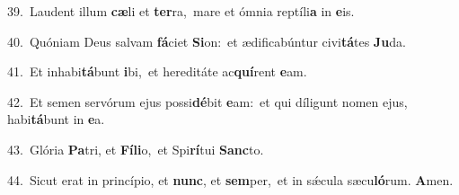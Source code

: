 {\numbfont\textcolor{\numbcolor}{39.}}~Laudent illum \textbf{cæ}\-li et \textbf{ter}\-ra,~\star mare et ómnia reptíli\textbf{a} in \textbf{e}\-is.\par
{\numbfont\textcolor{\numbcolor}{40.}}~Quóniam Deus salvam \textbf{fá}\-ciet \textbf{Si}\-on:~\star et ædificabúntur civi\-\textbf{tá}\-tes \textbf{Ju}\-da.\par
{\numbfont\textcolor{\numbcolor}{41.}}~Et inhabi\-\textbf{tá}\-bunt \textbf{i}\-bi,~\star et hereditáte ac\-\textbf{quí}\-rent \textbf{e}\-am.\par
{\numbfont\textcolor{\numbcolor}{42.}}~Et semen servórum ejus possi\-\textbf{dé}\-bit \textbf{e}\-am:~\star et qui díligunt nomen ejus, habi\-\textbf{tá}\-bunt in \textbf{e}\-a.\par
{\numbfont\textcolor{\numbcolor}{43.}}~Glória \textbf{Pa}\-tri, et \textbf{Fí}\-\textbf{li}o,~\star et Spi\-\textbf{rí}\-tui \textbf{Sanc}\-to.\par
{\numbfont\textcolor{\numbcolor}{44.}}~Sicut erat in princípio, et \textbf{nunc}\-, et \textbf{sem}\-per,~\star et in sǽcula sæcu\-\textbf{ló}\-rum. \textbf{A}\-men.\par
